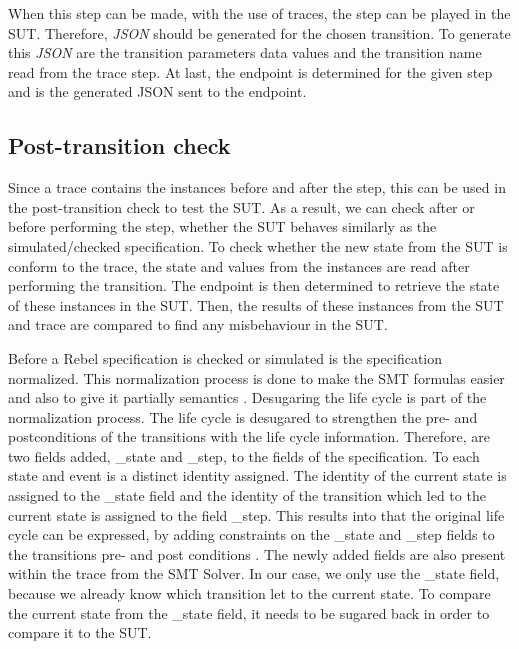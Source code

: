 When this step can be made, with the use of traces, the step can be played in the SUT. Therefore, \textit{JSON} should be generated for the chosen transition. To generate this \textit{JSON} are the transition parameters data values and the transition name read from the trace step. At last, the endpoint is determined for the given step and is the generated JSON sent to the endpoint.

\subsection{Post-transition check}

Since a trace contains the instances before and after the step, this can be used in the post-transition check to test the SUT. As a result, we can check after or before performing the step, whether the SUT behaves similarly as the simulated/checked specification. To check whether the new state from the SUT is conform to the trace, the state and values from the instances are read after performing the transition. The endpoint is then determined to retrieve the state of these instances in the SUT. Then, the results of these instances from the SUT and trace are compared to find any misbehaviour in the SUT. 

Before a Rebel specification is checked or simulated is the specification normalized. This normalization process is done to make the SMT formulas easier and also to give it partially semantics \cite[p.5]{stoel_storm_vinju_bosman_2016}. Desugaring the life cycle is part of the normalization process. The life cycle is desugared to strengthen the pre- and postconditions of the transitions with the life cycle information. Therefore, are two fields added, \_state and \_step, to the fields of the specification. To each state and event is a distinct identity assigned. The identity of the current state is assigned to the \_state field and the identity of the transition which led to the current state is assigned to the field \_step. This results into that the original life cycle can be expressed, by adding constraints on the \_state and \_step fields to the transitions pre- and post conditions \cite[p.5]{stoel_storm_vinju_bosman_2016}. The newly added fields are also present within the trace from the SMT Solver. In our case, we only use the \_state field, because we already know which transition let to the current state. To compare the current state from the \_state field, it needs to be sugared back in order to compare it to the SUT.

